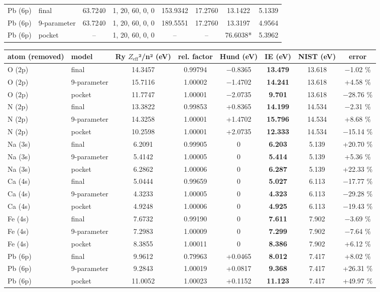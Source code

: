 \documentclass[aps,pra,preprint,notitlepage,superscriptaddress,amsmath,amssymb]{revtex4-2}
\begin{document}
\begin{table}[htbp]
\begin{adjustbox}{max width=\linewidth}
\begin{tabular}{llcccccc}
Pb (6p) & final & 63.7240 & 1, 20, 60, 0, 0 & 153.9342 & 17.2760 & 13.1422 & 5.1339 \\
Pb (6p) & 9-parameter & 63.7240 & 1, 20, 60, 0, 0 & 189.5551 & 17.2760 & 13.3197 & 4.9564 \\
Pb (6p) & pocket & – & 1, 20, 60, 0, 0 & – & – & 76.6038* & 5.3962 \\
\hline\hline
\end{tabular}
\end{adjustbox}
\medskip
\begin{adjustbox}{max width=\linewidth}
\begin{tabular}{llcccccc}
\hline\hline
atom (removed) & model & Ry $Z_{\mathrm{eff}}$²/n² (eV) & rel. factor & Hund (eV) & IE (eV) & NIST (eV) & error \\
\hline
O (2p) & final & 14.3457 & 0.99794 & −0.8365 & \textbf{13.479} & 13.618 & −1.02 \% \\
O (2p) & 9-parameter & 15.7116 & 1.00002 & −1.4702 & \textbf{14.241} & 13.618 & +4.58 \% \\
O (2p) & pocket & 11.7747 & 1.00001 & −2.0735 & \textbf{9.701} & 13.618 & −28.76 \% \\
N (2p) & final & 13.3822 & 0.99853 & +0.8365 & \textbf{14.199} & 14.534 & −2.31 \% \\
N (2p) & 9-parameter & 14.3258 & 1.00001 & +1.4702 & \textbf{15.796} & 14.534 & +8.68 \% \\
N (2p) & pocket & 10.2598 & 1.00001 & +2.0735 & \textbf{12.333} & 14.534 & −15.14 \% \\
Na (3s) & final & 6.2091 & 0.99905 & 0 & \textbf{6.203} & 5.139 & +20.70 \% \\
Na (3s) & 9-parameter & 5.4142 & 1.00005 & 0 & \textbf{5.414} & 5.139 & +5.36 \% \\
Na (3s) & pocket & 6.2862 & 1.00006 & 0 & \textbf{6.287} & 5.139 & +22.33 \% \\
Ca (4s) & final & 5.0444 & 0.99659 & 0 & \textbf{5.027} & 6.113 & −17.77 \% \\
Ca (4s) & 9-parameter & 4.3233 & 1.00005 & 0 & \textbf{4.323} & 6.113 & −29.28 \% \\
Ca (4s) & pocket & 4.9248 & 1.00006 & 0 & \textbf{4.925} & 6.113 & −19.43 \% \\
Fe (4s) & final & 7.6732 & 0.99190 & 0 & \textbf{7.611} & 7.902 & −3.69 \% \\
Fe (4s) & 9-parameter & 7.2983 & 1.00009 & 0 & \textbf{7.299} & 7.902 & −7.64 \% \\
Fe (4s) & pocket & 8.3855 & 1.00011 & 0 & \textbf{8.386} & 7.902 & +6.12 \% \\
Pb (6p) & final & 9.9612 & 0.79963 & +0.0465 & \textbf{8.012} & 7.417 & +8.02 \% \\
Pb (6p) & 9-parameter & 9.2843 & 1.00019 & +0.0817 & \textbf{9.368} & 7.417 & +26.31 \% \\
Pb (6p) & pocket & 11.0052 & 1.00023 & +0.1152 & \textbf{11.123} & 7.417 & +49.97 \% \\
\hline\hline
\end{tabular}
\end{adjustbox}
\end{table}
\end{document}

